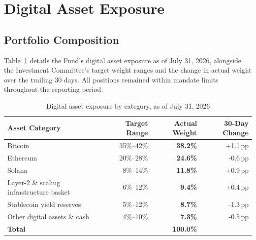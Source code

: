 \section{Digital Asset Exposure}

\subsection{Portfolio Composition}

Table~\ref{tab:asset-exposure} details the Fund's digital asset exposure as of July 31, 2026, alongside the Investment Committee's target weight ranges and the change in actual weight over the trailing 30 days. All positions remained within mandate limits throughout the reporting period.

\begin{table}[H]
\centering
\small
\caption{Digital asset exposure by category, as of July 31, 2026}
\label{tab:asset-exposure}
\begin{tabular}{@{}lrrr@{}}
\toprule
\textbf{Asset Category} & \textbf{Target Range} & \textbf{Actual Weight} & \textbf{30-Day Change} \\
\midrule
Bitcoin & 35\%--42\% & \textbf{38.2\%} & +1.1\,pp \\
Ethereum & 20\%--28\% & \textbf{24.6\%} & -0.6\,pp \\
Solana & 8\%--14\% & \textbf{11.8\%} & +0.9\,pp \\
Layer-2 \& scaling infrastructure basket & 6\%--12\% & \textbf{9.4\%} & +0.4\,pp \\
Stablecoin yield reserves & 5\%--12\% & \textbf{8.7\%} & -1.3\,pp \\
Other digital assets \& cash & 4\%--10\% & \textbf{7.3\%} & -0.5\,pp \\
\midrule
\textbf{Total} & & \textbf{100.0\%} & \\
\bottomrule
\end{tabular}
\end{table}

